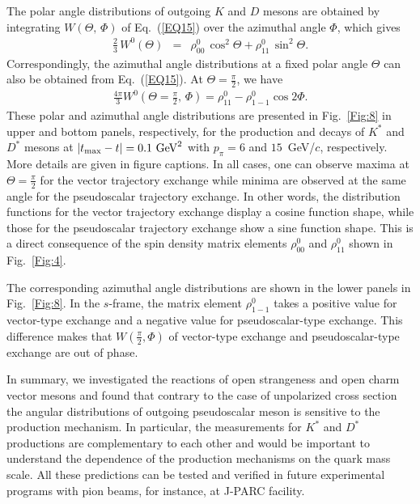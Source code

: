 \documentclass[a4paper,12pt]{article}
\begin{document}
The polar angle distributions of outgoing $K$ and $D$ mesons are obtained by integrating
$W(\Theta,\,\Phi)$ of Eq.~(\ref{EQ15}) over the azimuthal angle $\Phi$,
which gives
\begin{eqnarray}
\frac{2}{3}\,W^{0}(\Theta) &=& \rho^0_{00}\, \cos^2\Theta + \rho^0_{11}\, \sin^2\Theta .
\label{EQ155}
\end{eqnarray}
Correspondingly, the azimuthal angle distributions at a fixed polar angle $\Theta$ can also be obtained from
Eq.~(\ref{EQ15}).
At $\Theta=\frac{\pi}{2}$, we have
\begin{eqnarray}
\frac{4\pi}{3} W^{0}(\Theta=\frac{\pi}{2},\,\Phi) =
\rho^0_{11}-\rho^0_{1-1}\cos2\Phi .
\label{EQ1555}
\end{eqnarray}
These polar and azimuthal angle distributions are presented in Fig.~\ref{Fig:8}
in upper and bottom panels, respectively,
for the production and decays of
$K^*$ and $D^*$ mesons at $|{t_{\rm max}-t}| =  0.1 \mbox{ GeV}^2$ with $p_\pi^{} = 6$
and $15$~GeV/$c$, respectively. More details are given in figure captions.
In all cases, one can observe maxima at $\Theta=\frac{\pi}{2}$ for the vector trajectory exchange
while minima are observed at the same angle for the pseudoscalar trajectory exchange.
In other words, the distribution functions for the vector trajectory exchange display a cosine function
shape, while those for the pseudoscalar trajectory exchange show a sine function shape.
This is a direct consequence of the spin density matrix elements $\rho^0_{00}$ and
$\rho^0_{11}$ shown in Fig.~\ref{Fig:4}.

The corresponding azimuthal angle distributions are shown in the lower panels in Fig.~\ref{Fig:8}.
In the $s$-frame, the matrix element $\rho^0_{1-1}$ takes a positive value for vector-type
exchange and a negative value for pseudoscalar-type exchange.
This difference makes that $W(\frac{\pi}{2},\Phi)$ of vector-type exchange and
pseudoscalar-type exchange are out of phase.

In summary,  we investigated the reactions of open strangeness and open charm vector mesons
and found that contrary to the case of unpolarized cross section
the angular distributions of outgoing pseudoscalar meson is sensitive to the production
mechanism.
In particular, the measurements for $K^*$ and $D^*$ productions are complementary to each other
and would be important to understand the dependence of the production mechanisms on the
quark mass scale.
All these predictions can be tested and verified in future experimental programs with pion beams, for
instance, at J-PARC facility.
\end{document}
